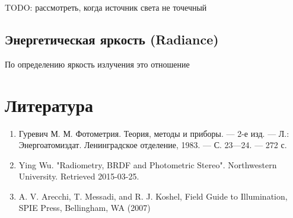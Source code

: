 \documentclass[12pt]{article}
\begin{document}
TODO: рассмотреть, когда источник света не точечный

\subsection{Энергетическая яркость (Radiance)}

По определению яркость излучения это отношение

\newpage

\section{Литература}
\begin{enumerate}
  \item Гуревич М. М. Фотометрия. Теория, методы и приборы. — 2-е изд. — Л.: Энергоатомиздат. Ленинградское отделение, 1983. — С. 23—24. — 272 с.
  \item Ying Wu. "Radiometry, BRDF and Photometric Stereo". Northwestern University. Retrieved 2015-03-25.
  \item A. V. Arecchi, T. Messadi, and R. J. Koshel, Field Guide to Illumination, SPIE Press, Bellingham, WA (2007)
\end{enumerate}
\end{document}
